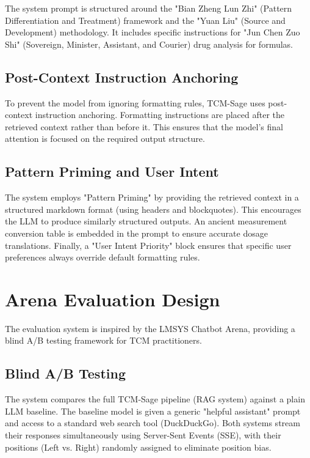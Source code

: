 The system prompt is structured around the "Bian Zheng Lun Zhi" (Pattern Differentiation and Treatment) framework and the "Yuan Liu" (Source and Development) methodology. It includes specific instructions for "Jun Chen Zuo Shi" (Sovereign, Minister, Assistant, and Courier) drug analysis for formulas.

\subsection{Post-Context Instruction Anchoring}

To prevent the model from ignoring formatting rules, TCM-Sage uses post-context instruction anchoring. Formatting instructions are placed after the retrieved context rather than before it. This ensures that the model's final attention is focused on the required output structure.

\subsection{Pattern Priming and User Intent}

The system employs "Pattern Priming" by providing the retrieved context in a structured markdown format (using headers and blockquotes). This encourages the LLM to produce similarly structured outputs. An ancient measurement conversion table is embedded in the prompt to ensure accurate dosage translations. Finally, a "User Intent Priority" block ensures that specific user preferences always override default formatting rules.

\section{Arena Evaluation Design}

The evaluation system is inspired by the LMSYS Chatbot Arena, providing a blind A/B testing framework for TCM practitioners.

\subsection{Blind A/B Testing}

The system compares the full TCM-Sage pipeline (RAG system) against a plain LLM baseline. The baseline model is given a generic "helpful assistant" prompt and access to a standard web search tool (DuckDuckGo). Both systems stream their responses simultaneously using Server-Sent Events (SSE), with their positions (Left vs. Right) randomly assigned to eliminate position bias.

